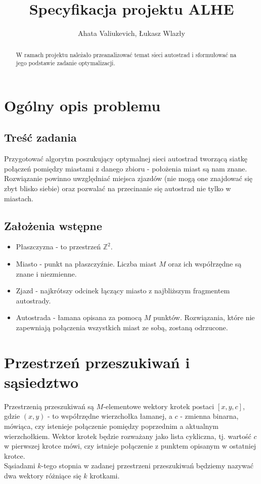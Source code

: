 \documentclass{article}
\title{Specyfikacja projektu ALHE}
\author{Ahata Valiukevich, Łukasz Wlazły}
\begin{document}
\maketitle
\begin{abstract}
W ramach projektu należało przeanalizować temat sieci autostrad i sformułować na jego podstawie zadanie optymalizacji.
\end{abstract}

\section{Ogólny opis problemu}
\subsection{Treść zadania}
Przygotować algorytm poszukujący optymalnej sieci autostrad tworzącą siatkę połączeń pomiędzy miastami z danego zbioru - położenia miast są nam znane. Rozwiązanie powinno uwzględniać miejsca zjazdów (nie mogą one znajdować się zbyt blisko siebie) oraz pozwalać na przecinanie się autostrad nie tylko w miastach.
\subsection{Założenia wstępne}
\begin{itemize}
\item Płaszczyzna - to przestrzeń $\mathbb{Z}^{2}$.
\item Miasto - punkt na płaszczyźnie. Liczba miast $M$ oraz ich współrzędne są znane i niezmienne.
\item Zjazd - najkrótszy odcinek łączący miasto z najbliższym fragmentem autostrady.
\item Autostrada - łamana opisana za pomocą $M$ punktów. Rozwiązania, które nie zapewniają połączenia wszystkich miast ze sobą, zostaną odrzucone.
\end{itemize}

\section{Przestrzeń przeszukiwań i sąsiedztwo}
Przestrzenią przeszukiwań są $M$-elementowe wektory krotek postaci $[x, y, c]$, gdzie $(x, y)$ - to współrzędne wierzchołka łamanej, a $c$ - zmienna binarna, mówiąca, czy istenieje połączenie pomiędzy poprzednim a aktualnym wierzchołkiem. Wektor krotek będzie rozważany jako lista cykliczna, tj. wartość $c$ w pierwszej krotce mówi, czy istnieje połączenie z punktem opisanym w ostatniej krotce.\\
Sąsiadami $k$-tego stopnia w zadanej przestrzeni przeszukiwań będziemy nazywać dwa wektory różniące się $k$ krotkami.
\end{document}
